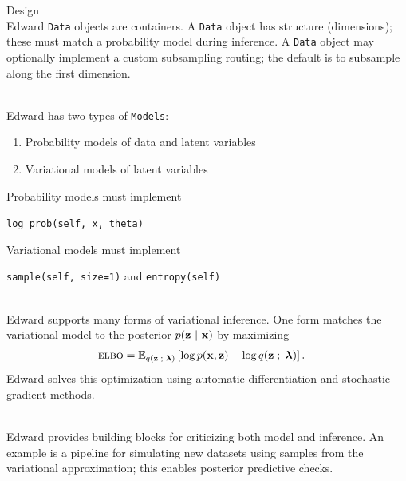 \documentclass{beamer}
\begin{document}
\begin{frame}[t]
\begin{columns}[t,totalwidth=10in]
\begin{column}{\onecolwid}
\begin{block}{Design}
\\
Edward \texttt{Data} objects are containers. A \texttt{Data} object has structure 
(dimensions); these must match a probability model during inference. A \texttt
{Data} object may optionally implement a custom subsampling routing; the default
is to subsample along the first dimension.

\vspace*{0.5in}

\\
Edward has two types of \texttt{Models}:
\begin{enumerate}
  \item Probability models of data and latent variables
  \item Variational models of latent variables
\end{enumerate}

Probability models must implement
\begin{center}
\texttt{log\_prob(self, x, theta)}
\end{center}

Variational models must implement
\begin{center}
\texttt{sample(self, size=1)} and \texttt{entropy(self)}
\end{center}

\vspace*{0.5in}

\\
Edward supports many forms of variational inference. One form matches the
variational model to the posterior $p(\boldsymbol{\mathbf{z}}~\vert~\boldsymbol{\mathbf{x}})$ by maximizing
\begin{align}
  \textsc{elbo} &= 
  \mathbb{E}_{q(\boldsymbol{\mathbf{z}}\;;\;\boldsymbol{\mathbf{\lambda}})}
  \left[
  \log p(\boldsymbol{\mathbf{x}},\boldsymbol{\mathbf{z}})
  -
  \log q(\boldsymbol{\mathbf{z}}\;;\;\boldsymbol{\mathbf{\lambda}})
  \right].
  \label{eq:elbo}
\end{align}
Edward solves this optimization using automatic differentiation and stochastic
gradient methods.

\vspace*{0.5in}

\\
Edward provides building blocks for criticizing both model and inference.
An example is a pipeline for simulating new datasets using samples from the
variational approximation; this enables posterior predictive checks.

\end{block}


\end{column}
\end{columns}
\end{frame}
\end{document}
